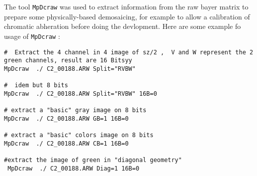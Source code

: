 The tool {\tt MpDcraw} was used to extract information from the raw bayer matrix  to prepare
some physically-based demosaicing,  for example to allow a calibration of chromatic abheration
before doing the devlopment. Here are some example fo usage of {\tt MpDcraw} :


\begin{verbatim}
#  Extract the 4 channel in 4 image of sz/2 ,  V and W represent the 2 green channels, result are 16 Bitsyy
MpDcraw  ./ C2_00188.ARW Split="RVBW"

#  idem but 8 bits
MpDcraw  ./ C2_00188.ARW Split="RVBW" 16B=0

# extract a "basic" gray image on 8 bits
MpDcraw  ./ C2_00188.ARW GB=1 16B=0

# extract a "basic" colors image on 8 bits
MpDcraw  ./ C2_00188.ARW CB=1 16B=0

#extract the image of green in "diagonal geometry" 
 MpDcraw  ./ C2_00188.ARW Diag=1 16B=0


\end{verbatim}








